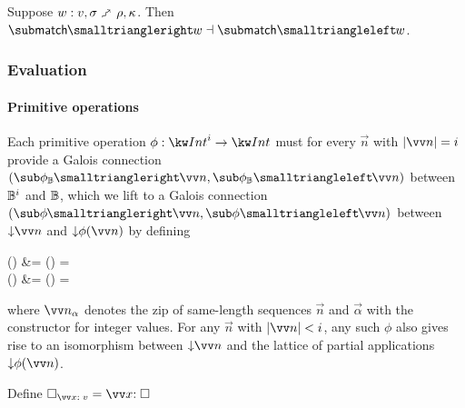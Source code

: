 \begin{theorem}
\label{thm:core-language:match:gc}
   Suppose $w: v, \sigma \matchFwdS \rho, \kappa$.  Then $\matchFwdF{w} \adjoint \matchBwdF{w}$.
\end{theorem}

\subsubsection{Evaluation}

\paragraph{Primitive operations}

Each primitive operation $\phi: \tyInt^{i} \to \tyInt$ must for every $\vec{n}$ with $\length{\vec{n}} = i$ provide a Galois connection $(\primFwdBool{\phi}{\vec{n}}, \primBwdBool{\phi}{\vec{n}})$ between $\mathbb{B}^i$ and $\mathbb{B}$, which we lift to a Galois connection $(\primFwd{\phi}{\vec{n}}, \primBwd{\phi}{\vec{n}})$ between $\Below{\vec{n}}$ and $\Below{\phi(\vec{n})}$ by defining
\begin{definition}
\label{def:core-language:primop-gc}
\begin{salign}
   () &= 
   (\vec{\alpha}) = \beta
   \\
   () &= 
   (\beta) = \vec{\alpha}
\end{salign}
\end{definition}

\noindent where $\vec{\annInt{n}{\alpha}}$ denotes the zip of same-length sequences $\vec{n}$ and $\vec{\alpha}$ with the constructor for integer values. For any $\vec{n}$ with $\length{\vec{n}} \numlt i$, any such $\phi$ also gives rise to an isomorphism between $\Below{\vec{n}}$ and the lattice of partial applications $\Below{\exPrimOp{\phi}{\vec{n}}}$.





\begin{definition}
Define $\hole_{\vec{\bind{x}{v}}} = \vec{\bind{x}{\hole}}$
\end{definition}

